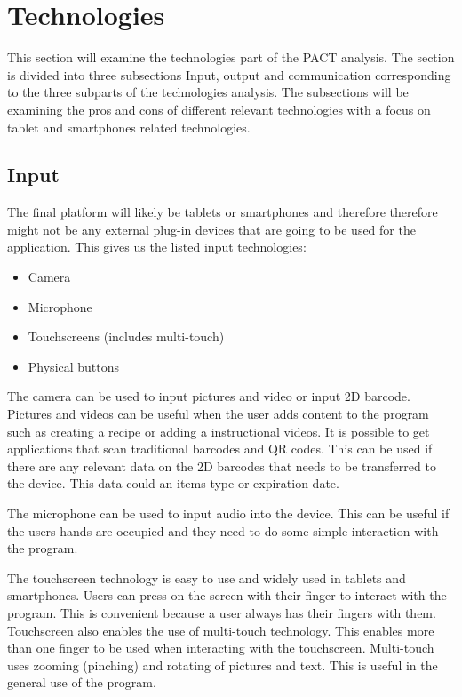 \section{Technologies}
This section will examine the technologies part of the PACT analysis. The section is divided into three subsections Input, output and communication corresponding to the three subparts of the technologies analysis. The subsections will be examining the pros and cons of different relevant technologies with a focus on tablet and smartphones related technologies.

\subsection{Input}
The final platform will likely be tablets or smartphones and therefore therefore might not be any external plug-in devices that are going to be used for the application. This gives us the listed input technologies:

\begin{itemize}
    \item Camera
    \item Microphone
    \item Touchscreens (includes multi-touch)
    \item Physical buttons
\end{itemize}

The camera can be used to input pictures and video or input 2D barcode. Pictures and videos can be useful when the user adds content to the program such as creating a recipe or adding a instructional videos. It is possible to get applications that scan traditional barcodes and QR codes. This can be used if there are any relevant data on the 2D barcodes that needs to be transferred to the device. This data could an items type or expiration date.           
      
The microphone can be used to input audio into the device. This can be useful if the users hands are occupied and they need to do some simple interaction with the program.  


The touchscreen technology is easy to use and widely used in tablets and smartphones. Users can press on the screen with their finger to interact with the program. This is convenient because a user always has their fingers with them. Touchscreen also enables the use of multi-touch technology. This enables more than one finger to be used when interacting with the touchscreen. Multi-touch uses zooming (pinching) and rotating of pictures and text. This is useful in the general use of the program.       

